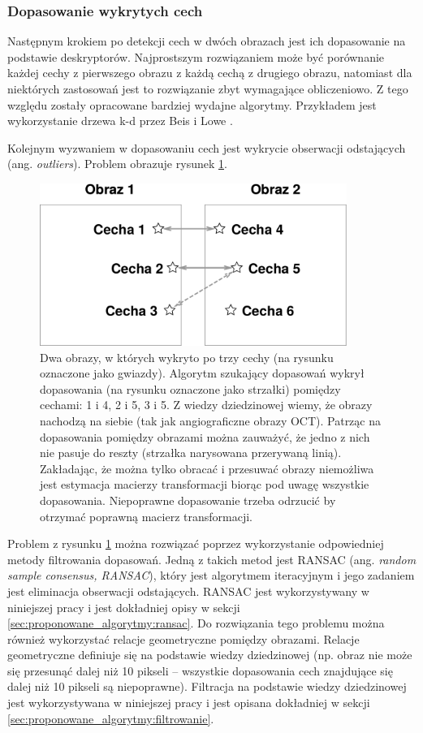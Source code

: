 \subsubsection{Dopasowanie wykrytych cech}

Następnym krokiem po detekcji cech w dwóch obrazach jest ich dopasowanie na podstawie deskryptorów. Najprostszym rozwiązaniem może być porównanie każdej cechy z pierwszego obrazu z każdą cechą z drugiego obrazu, natomiast dla niektórych zastosowań jest to rozwiązanie zbyt wymagające obliczeniowo. Z tego względu zostały opracowane bardziej wydajne algorytmy. Przykładem jest wykorzystanie drzewa k-d przez Beis i Lowe \cite{Beis:1997}.

Kolejnym wyzwaniem w dopasowaniu cech jest wykrycie obserwacji odstających (ang. \textit{outliers}). Problem obrazuje rysunek \ref{fig:algorytmy_korejestracji:outliers}.

\begin{figure}[htb]
  \centering
  \includegraphics[width=10cm]{gfx/match}
  \caption{Dwa obrazy, w których wykryto po trzy cechy (na rysunku oznaczone jako gwiazdy). Algorytm szukający dopasowań wykrył dopasowania (na rysunku oznaczone jako strzałki) pomiędzy cechami: 1 i 4, 2 i 5, 3 i 5. Z wiedzy dziedzinowej wiemy, że obrazy nachodzą na siebie (tak jak angiograficzne obrazy OCT). Patrząc na dopasowania pomiędzy obrazami można zauważyć, że jedno z nich nie pasuje do reszty (strzałka narysowana przerywaną linią). Zakładając, że można tylko obracać i przesuwać obrazy niemożliwa jest estymacja macierzy transformacji biorąc pod uwagę wszystkie dopasowania. Niepoprawne dopasowanie trzeba odrzucić by otrzymać poprawną macierz transformacji.}
  \label{fig:algorytmy_korejestracji:outliers}
\end{figure}

Problem z rysunku \ref{fig:algorytmy_korejestracji:outliers} można rozwiązać poprzez wykorzystanie odpowiedniej metody filtrowania dopasowań. Jedną z takich metod jest RANSAC (ang. \textit{random sample consensus, RANSAC}), który jest algorytmem iteracyjnym i jego zadaniem jest eliminacja obserwacji odstających. RANSAC jest wykorzystywany w niniejszej pracy i jest dokładniej opisy w sekcji \ref{sec:proponowane_algorytmy:ransac}. Do rozwiązania tego problemu można również wykorzystać relacje geometryczne pomiędzy obrazami. Relacje geometryczne definiuje się na podstawie wiedzy dziedzinowej (np. obraz nie może się przesunąć dalej niż 10 pikseli -- wszystkie dopasowania cech znajdujące się dalej niż 10 pikseli są niepoprawne). Filtracja na podstawie wiedzy dziedzinowej jest wykorzystywana w niniejszej pracy i jest opisana dokładniej w sekcji \ref{sec:proponowane_algorytmy:filtrowanie}.

